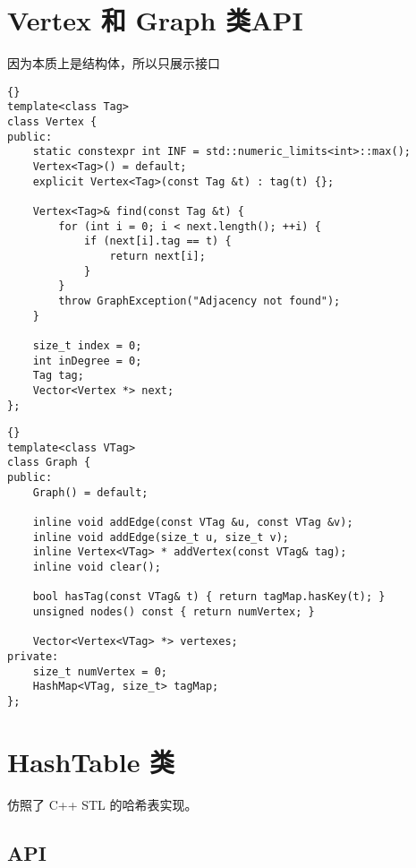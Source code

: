 \chapter{Vertex 和 Graph 类API}

因为本质上是结构体，所以只展示接口


\begin{lstlisting}[morendkeywords={Vertex}, firstnumber=796, caption=Vertex 类定义]{}
template<class Tag>
class Vertex {
public:
    static constexpr int INF = std::numeric_limits<int>::max();
    Vertex<Tag>() = default;
    explicit Vertex<Tag>(const Tag &t) : tag(t) {};

    Vertex<Tag>& find(const Tag &t) {
        for (int i = 0; i < next.length(); ++i) {
            if (next[i].tag == t) {
                return next[i];
            }
        }
        throw GraphException("Adjacency not found");
    }

    size_t index = 0;
    int inDegree = 0;
    Tag tag;
    Vector<Vertex *> next;
};
\end{lstlisting}

\begin{lstlisting}[morendkeywords={Graph}, firstnumber=819, caption=Graph 类定义]{}
template<class VTag>
class Graph {
public:
    Graph() = default;

    inline void addEdge(const VTag &u, const VTag &v);
    inline void addEdge(size_t u, size_t v);
    inline Vertex<VTag> * addVertex(const VTag& tag);
    inline void clear();

    bool hasTag(const VTag& t) { return tagMap.hasKey(t); }
    unsigned nodes() const { return numVertex; }

    Vector<Vertex<VTag> *> vertexes;
private:
    size_t numVertex = 0;
    HashMap<VTag, size_t> tagMap;
};
\end{lstlisting}



\chapter{HashTable 类}

仿照了 C++ STL 的哈希表实现。

\section{API}

